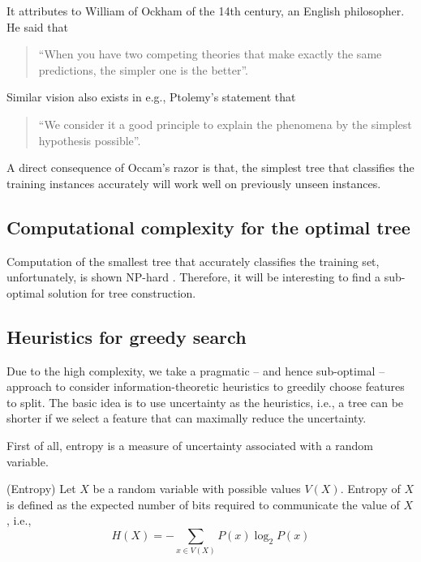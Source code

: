 It attributes to William of Ockham of the 14th century, an English philosopher. He said that 
\begin{quote}
    ``When you have two competing theories that make exactly the same predictions, the simpler one is the better''.
\end{quote} Similar vision also exists in e.g., Ptolemy's statement that 
\begin{quote}
    ``We consider it a good principle to explain the phenomena by the simplest hypothesis possible''.
\end{quote} 


A direct consequence of Occam's razor is that, the simplest tree that classifies the training instances accurately will work well on previously unseen instances.

\subsection*{Computational complexity for the optimal tree} 

Computation of the smallest tree that accurately classifies the training set, unfortunately, is shown NP-hard \cite{HYAFIL197615}. Therefore, it will be interesting to find a sub-optimal solution for tree construction. 

\subsection*{Heuristics for greedy search}

Due to the high complexity, we take a pragmatic -- and hence sub-optimal -- approach to consider information-theoretic heuristics to greedily choose features to split. The basic idea is to use uncertainty as the heuristics, i.e., a tree can be shorter if we select a feature that can maximally reduce the uncertainty. 

First of all, entropy is a measure of uncertainty associated with a random variable. 

\begin{definition}\label{def:entropy}
(Entropy) Let $X$ be a random variable with possible values $V(X)$. Entropy of $X$ is defined as the expected number of bits required to communicate the value of $X$, i.e.,  
\begin{equation}
    H(X) = -\sum_{x\in V(X)} P(x)\log_2P(x)
\end{equation}
\end{definition}

